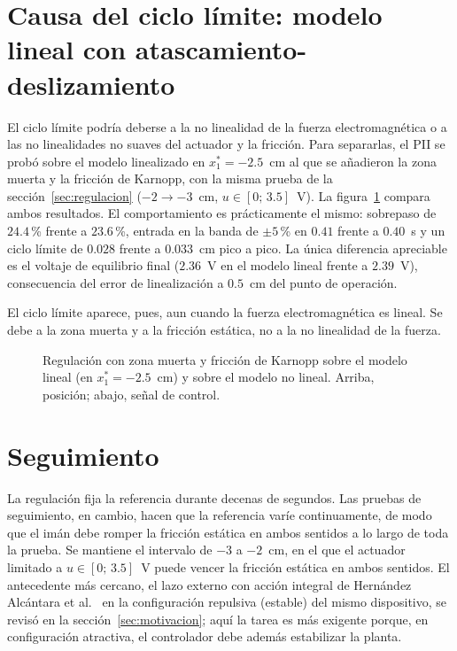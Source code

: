 \FloatBarrier

\section{Causa del ciclo límite: modelo lineal con atascamiento-deslizamiento}
\label{sec:lineal_ad}

El ciclo límite podría deberse a la no linealidad de la fuerza electromagnética o a las no linealidades no suaves del actuador y la fricción. Para separarlas, el PII se probó sobre el modelo linealizado en $x_1^*=-2.5$~cm al que se añadieron la zona muerta y la fricción de Karnopp, con la misma prueba de la sección~\ref{sec:regulacion} ($-2\to-3$~cm, $u\in[0;\,3.5]$~V). La figura~\ref{fig:p8_lineal_ad} compara ambos resultados. El comportamiento es prácticamente el mismo: sobrepaso de $24.4$\,\% frente a $23.6$\,\%, entrada en la banda de $\pm5$\,\% en $0.41$ frente a $0.40$~s y un ciclo límite de $0.028$ frente a $0.033$~cm pico a pico. La única diferencia apreciable es el voltaje de equilibrio final ($2.36$~V en el modelo lineal frente a $2.39$~V), consecuencia del error de linealización a $0.5$~cm del punto de operación.

El ciclo límite aparece, pues, aun cuando la fuerza electromagnética es lineal. Se debe a la zona muerta y a la fricción estática, no a la no linealidad de la fuerza.

\begin{figure}[ht]
    \centering
    
    \caption[Modelo lineal con atascamiento-deslizamiento]{Regulación con zona muerta y fricción de Karnopp sobre el modelo lineal (en $x_1^*=-2.5$~cm) y sobre el modelo no lineal. Arriba, posición; abajo, señal de control.}
    \label{fig:p8_lineal_ad}
\end{figure}

\FloatBarrier

\section{Seguimiento}

La regulación fija la referencia durante decenas de segundos. Las pruebas de seguimiento, en cambio, hacen que la referencia varíe continuamente, de modo que el imán debe romper la fricción estática en ambos sentidos a lo largo de toda la prueba. Se mantiene el intervalo de $-3$ a $-2$~cm, en el que el actuador limitado a $u\in[0;\,3.5]$~V puede vencer la fricción estática en ambos sentidos. El antecedente más cercano, el lazo externo con acción integral de Hernández Alcántara et al.~\cite{alcantara} en la configuración repulsiva (estable) del mismo dispositivo, se revisó en la sección~\ref{sec:motivacion}; aquí la tarea es más exigente porque, en configuración atractiva, el controlador debe además estabilizar la planta.


